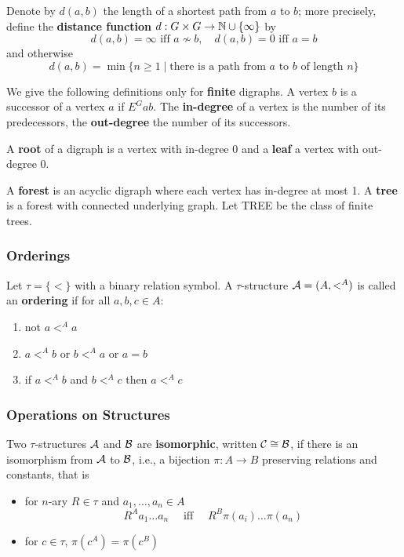 \documentclass[11pt]{article}
\begin{document}
Denote by \(d(a,b)\) the length of a shortest path from \(a\) to \(b\); more
precisely, define the \textbf{distance function} \(d:G\times G\to\mathbb{N}\cup\{\infty\}\)
by
\begin{equation*}
d(a,b)=\infty\text{ iff }a\not\sim b,\quad d(a,b)=0\text{ iff }a=b
\end{equation*}
and otherwise
\begin{equation*}
d(a,b)=\min\{n\ge1\mid\text{there is a path from $a$ to $b$ of length $n$}\}
\end{equation*}

We give the following definitions only for \textbf{finite} digraphs. A vertex \(b\)
is a successor of a vertex \(a\) if \(E^Gab\). The \textbf{in-degree} of a vertex is
the number of its predecessors, the \textbf{out-degree} the number of its
successors.

A \textbf{root} of a digraph is a vertex with in-degree 0 and a \textbf{leaf} a vertex with
out-degree 0.

A \textbf{forest} is an acyclic digraph where each vertex has in-degree at most 1. A
\textbf{tree} is a forest with connected underlying graph. Let TREE be the class of
finite trees.

\subsubsection{Orderings}
\label{sec:orgb47724f}
Let \(\tau=\{<\}\) with a binary relation symbol. A \(\tau\)-structure \(\mathcal{A}=(A,<^A)\) is
called an \textbf{ordering} if for all \(a,b,c\in A\):
\begin{enumerate}
\item not \(a<^A a\)
\item \(a<^A b\) or \(b<^A a\) or \(a=b\)
\item if \(a<^Ab\) and \(b<^Ac\) then \(a<^Ac\)
\end{enumerate}
\subsubsection{Operations on Structures}
\label{sec:org454e543}
Two \(\tau\)-structures \(\mathcal{A}\) and \(\mathcal{B}\) are \textbf{isomorphic}, written \(\mathcal{C}\cong\mathcal{B}\), if
there is an isomorphism from \(\mathcal{A}\) to \(\mathcal{B}\), i.e., a bijection \(\pi:A\to B\) preserving
relations and constants, that is
\begin{itemize}
\item for \(n\)-ary \(R\in \tau\) and \(a_1,\dots,a_n\in A\)
\begin{equation*}
R^Aa_1\dots a_n \quad\text{ iff }\quad
R^B\pi(a_i)\dots\pi(a_n)
\end{equation*}
\item for \(c\in\tau\), \(\pi(c^A)=\pi(c^B)\)
\end{itemize}
\end{document}
